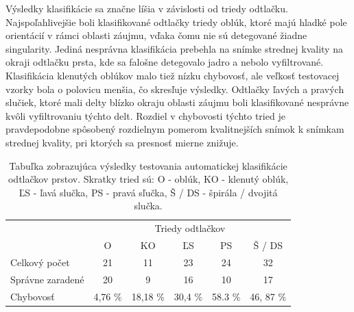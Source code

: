   Výsledky klasifikácie sa značne líšia v závislosti od triedy odtlačku. Najspoľahlivejšie boli klasifikované odtlačky triedy oblúk, ktoré majú hladké
  pole orientácií v rámci oblasti záujmu, vďaka čomu nie sú detegované žiadne singularity. Jediná nesprávna klasifikácia prebehla na snímke strednej kvality
  na okraji odtlačku prsta, kde sa falošne detegovalo jadro a nebolo vyfiltrované. Klasifikácia klenutých oblúkov malo tiež nízku chybovosť, ale veľkosť
  testovacej vzorky bola o polovicu menšia, čo skresľuje výsledky.
  Odtlačky ľavých a pravých slučiek, ktoré mali delty blízko okraju oblasti záujmu boli klasifikované nesprávne kvôli vyfiltrovaniu týchto delt. Rozdiel v
  chybovosti týchto tried je pravdepodobne spôsobený rozdielnym pomerom kvalitnejších snímok k snímkam strednej kvality, pri ktorých sa presnosť mierne
  znižuje.

  \begin{table}[ht]
    \centering
    \caption{Tabuľka zobrazujúca výsledky testovania automatickej klasifikácie odtlačkov prstov. Skratky tried sú: O - oblúk, KO - klenutý oblúk,
    ĽS - ľavá slučka, PS - pravá sľučka, Š / DS - špirála / dvojitá slučka.}
    \begin{tabular}{ l | c | c | c | c | c | }
      \cline{2-6}
                                              & \multicolumn{5}{|c|}{Triedy odtlačkov}            \\
      \cline{2-6}
                                              & O       & KO        & ĽS     & PS    & Š / DS     \\
      \hline
      \multicolumn{1}{|l|}{Celkový počet}     & 21      & 11        & 23      & 24    & 32        \\
      \multicolumn{1}{|l|}{Správne zaradené}  & 20      & 9         & 16      & 10    & 17        \\
      \multicolumn{1}{|l|}{Chybovosť}         & 4,76 \% & 18,18 \%  & 30,4 \% & 58.3 \% & 46, 87 \% \\
      \hline
    \end{tabular}
    \label{tab:vysledky_testov}
  \end{table}

